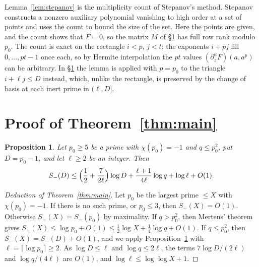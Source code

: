 \documentclass[11pt]{amsart}
\newtheorem{proposition}[theorem]{Proposition}
\theoremstyle{remark}
\begin{document}
Lemma~\ref{lem:stepanov} is the multiplicity count of Stepanov's method. Stepanov
constructs a nonzero auxiliary polynomial vanishing to high order at a set of points and uses the count to bound
the size of the set. Here the points are given, and the count shows that $F=0$, so the matrix $M$
of \S\ref{sec:main} has full row rank modulo $p_0$. The count is exact on the rectangle $i<p$, $j<t$: the exponents
$i+pj$ fill $0,\dots,pt-1$ once each, so by Hermite interpolation the $pt$ values
$(\partial_z^\kappa F)(a,a^p)$ can be arbitrary. In \S\ref{sec:main} the lemma is applied
with $p=p_0$ to the triangle $i+\ell j\le D$ instead, which, unlike the rectangle, is preserved by the change
of basis at each inert prime in $(\ell,D]$.

\section{Proof of Theorem~\ref{thm:main}}\label{sec:main}

\begin{proposition}\label{prop:ell}
Let $p_0\ge5$ be a prime with $\chi(p_0)=-1$ and $q\le p_0^2$, put $D=p_0-1$, and let $\ell\ge2$ be
an integer. Then
\[
S_-(D)\le\Bigl(\frac12+\frac{7}{2\ell}\Bigr)\log D+\frac{\ell+1}{4\ell}\log q+\log\ell+O(1).
\]
\end{proposition}

\begin{proof}[Deduction of Theorem~\ref{thm:main}]
Let $p_0$ be the largest prime $\le X$ with $\chi(p_0)=-1$. If there is no such prime, or $p_0\le3$,
then $S_-(X)=O(1)$. Otherwise $S_-(X)=S_-(p_0)$ by maximality. If $q>p_0^2$, then Mertens' theorem gives
$S_-(X)\le\log p_0+O(1)\le\frac12\log X+\frac14\log q+O(1)$. If $q\le p_0^2$, then $S_-(X)=S_-(D)+O(1)$, and we apply
Proposition~\ref{prop:ell} with $\ell=\lceil\log p_0\rceil\ge2$. As $\log D\le\ell$ and
$\log q\le2\ell$, the terms $7\log D/(2\ell)$ and $\log q/(4\ell)$ are $O(1)$, and
$\log\ell\le\log\log X+1$.
\end{proof}
\end{document}
